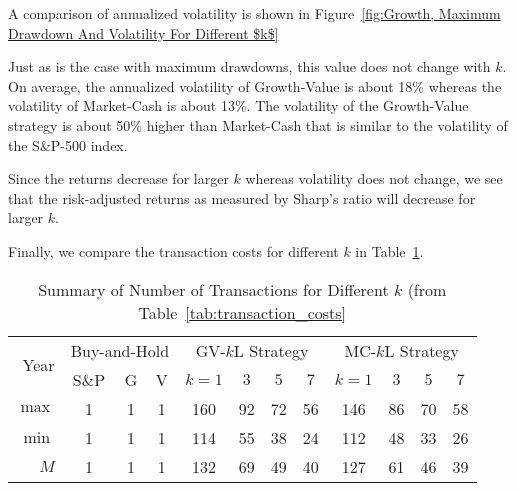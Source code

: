 \documentclass{article}
\begin{document}
A comparison of annualized volatility is shown in 
Figure~\ref{fig:Growth, Maximum Drawdown And Volatility For Different $k$}
\begin{comment}
\begin{figure}[htbp]
  \centering
  \texttt{[image: plots/volatility.png]}
  \caption{Comparing  for Different $k$}
  \label{fig:volatility_winner_loser_fridays}
\end{figure}
\end{comment}
Just as is the case with maximum drawdowns, this value does not change with $k$.
On average, the annualized volatility of Growth-Value is about 18\% whereas the volatility 
of Market-Cash is about 13\%. The volatility of the Growth-Value strategy is about 50\% higher than 
Market-Cash that is similar to the volatility of the S{\&}P-500 index.


Since the returns decrease for larger $k$ whereas volatility does not change, we see that the 
risk-adjusted returns as measured by Sharp's ratio will decrease for larger $k$.

Finally, we compare the transaction costs for different $k$ in Table~\ref{tab:transaction_costs_summary}.

\begin{table}[!ht]
    \centering
    \caption{Summary of Number of Transactions for Different $k$ (from Table~\ref{tab:transaction_costs}}
\begin{tabular}{r| ccc|| cccc||cccc}
\hline
\multirow{2}{*}{Year} & \multicolumn{3}{c||}{Buy-and-Hold}   & \multicolumn{4}{c||}{GV-$k$L Strategy}& \multicolumn{4}{c}{MC-$k$L Strategy}\\ \cline{2-12}
  & S\&P & G & V  & $k=1$  & $3$  & $5$  & $7$  & $k=1$  & $3$  & $5$  & $7$ \\ 
\hline
        $\max$ & 1 & 1 & 1 & 160 & 92 & 72 & 56 & 146 & 86 & 70 & 58 \\ 
        $\min$ & 1 & 1 & 1 & 114 & 55 & 38 & 24 & 112 & 48 & 33 & 26 \\ 
        $M$ & 1 & 1 & 1 & 132 & 69 & 49 & 40 & 127 & 61 & 46 & 39 \\ 
\hline
\end{tabular}
\label{tab:transaction_costs_summary}
\end{table}
\end{document}

